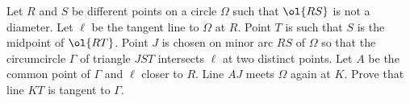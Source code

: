 Let $R$ and $S$ be different points on a circle $\Omega$
such that $\ol{RS}$ is not a diameter.
Let $\ell$ be the tangent line to $\Omega$ at $R$.
Point $T$ is such that $S$ is the midpoint of $\ol{RT}$.
Point $J$ is chosen on minor arc $RS$ of $\Omega$ so that
the circumcircle $\Gamma$ of triangle $JST$ intersects $\ell$
at two distinct points.
Let $A$ be the common point of $\Gamma$ and $\ell$ closer to $R$.
Line $AJ$ meets $\Omega$ again at $K$.
Prove that line $KT$ is tangent to $\Gamma$.